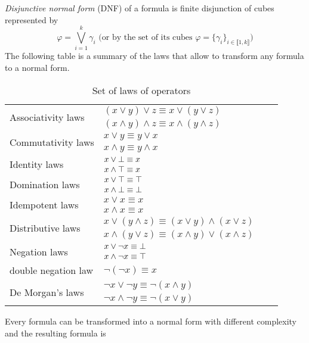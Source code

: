 \emph{Disjunctive normal form} (DNF) of a formula is finite disjunction of cubes represented by
  $$\varphi = \bigvee_{i=1}^k \gamma_i \text{ (or by the set of its cubes } \varphi = \{\gamma_i\}_{i \in \llbracket 1,k \rrbracket}\text{)}$$
The following table is a summary of the laws that allow to transform any formula to
a normal form.
\begin{table}[!htbp]
 \centering
 \begin{tabular}{lllc}
  \multirow{2}{*}{Associativity laws} & $(x \lor y) \lor z \equiv x \lor (y \lor z)$\\
          & $(x \land y) \land z \equiv x \land (y \land z)$\\
  \hline              
  \multirow{2}{*}{Commutativity laws} & $x \lor y \equiv y \lor x$\\
          & $x \land y \equiv y \land x$\\
  \hline      
  \multirow{2}{*}{Identity laws} & $x \lor \bot \equiv x$\\
           & $x \land \top \equiv x$\\
  \hline        
  \multirow{2}{*}{Domination laws} & $x \lor \top \equiv \top$\\
           &  $x \land \bot \equiv \bot$\\
  \hline        
  \multirow{2}{*}{Idempotent laws} & $x \lor x \equiv x$\\
               & $x \land x \equiv x$\\     
  \hline        
  \multirow{2}{*}{Distributive laws} & $x \lor (y \land z) \equiv (x \lor y) \land (x \lor z)$\\
           & $x \land (y \lor z) \equiv (x \land y) \lor (x \land z)$\\
 \hline        
 \multirow{2}{*}{Negation laws}  & $x \lor \neg x \equiv \bot$\\
        & $x \land \neg x \equiv \top$\\
  \hline
   double negation law & $\neg (\neg x) \equiv x$ \\
  \hline
  \multirow{2}{*}{De Morgan's laws} & $\neg x \lor \neg y \equiv \neg (x \land y)$\\
            &  $\neg x \land \neg y \equiv \neg (x \lor y)$\\
 \end{tabular}
 \caption{Set of laws of operators}
 \label{tab:laws}
\end{table}
Every formula can be transformed into a normal form with different complexity and the resulting formula is 
